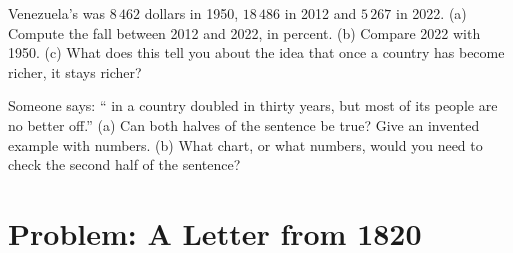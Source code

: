 \begin{exercise}[$\star\star\star$]\label{exo:g6:living-standards:11}
Venezuela's  was $8\,462$ dollars in 1950, $18\,486$ in 2012
and $5\,267$ in 2022. (a) Compute the fall between 2012 and 2022, in percent.
(b) Compare 2022 with 1950. (c) What does this tell you about the idea that once
a country has become richer, it stays richer?
\end{exercise}

\begin{exercise}[$\star\star\star$]\label{exo:g6:living-standards:12}
Someone says: `` in a country doubled in thirty years, but most
of its people are no better off.'' (a) Can both halves of the sentence be true?
Give an invented example with numbers. (b) What chart, or what numbers, would
you need to check the second half of the sentence?
\end{exercise}

\section{Problem: A Letter from 1820}

